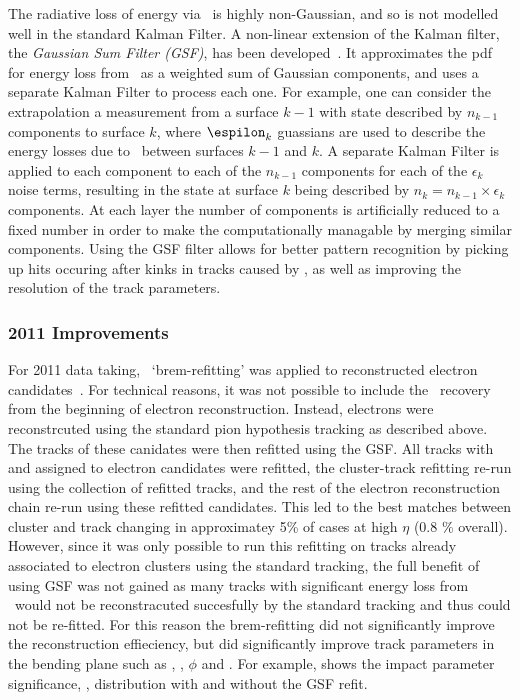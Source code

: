 The radiative loss of energy via \brem\ is highly non-Gaussian, and so is not
modelled well in the standard Kalman Filter. A non-linear extension of the
Kalman filter, the {\it Gaussian Sum Filter (GSF)}, has been
developed~\cite{Fruhwirth2003131,Atkinson:1448253}. It
approximates the pdf for energy loss from \brem\ as a weighted sum of Gaussian
components, and uses a separate Kalman Filter to process each one. For example,
one can consider the extrapolation a measurement from a surface $k-1$ with state
described by $n_{k-1}$ components to surface $k$, where $\espilon_{k}$ guassians
are used to describe the energy losses due to \brem\ between surfaces $k-1$ and
$k$. A separate Kalman Filter is applied to each component to each of the $n_{k-1}$
components for each of the $\epsilon_{k}$ noise terms, resulting in the state at
surface $k$ being described by $n_{k} = n_{k-1} \times \epsilon_{k}$ components.
At each layer the number of components is artificially reduced to a fixed number
in order to make the computationally managable by merging similar components.
Using the GSF filter allows for better pattern recognition by picking up hits
occuring after kinks in tracks caused by \brem, as well as improving the
resolution of the track parameters.

\subsubsection{2011 Improvements}

For 2011 data taking, \brem\ `brem-refitting' was applied to
reconstructed electron candidates~\cite{ATLAS-CONF-2012-047}. For technical reasons, it was not possible to
include the \brem\ recovery from the beginning of electron reconstruction.
Instead, electrons were reconstrcuted using the standard pion hypothesis
tracking as described above. The tracks of these canidates were then refitted
using the GSF. All tracks with  and  assigned to
electron candidates were refitted, the cluster-track refitting re-run
using the collection of refitted tracks, and the rest of the electron reconstruction
chain re-run using these refitted candidates. This led to the best matches between
cluster and track changing in approximatey 5\% of cases at high $\eta$ (0.8 \%
overall). However, since it was only possible to run this refitting on tracks
already associated to electron clusters using the standard tracking, the full
benefit of using GSF was not gained as many tracks with significant energy loss
from \brem\ would not be reconstracuted succesfully by the standard tracking and
thus could not be re-fitted. For this reason the brem-refitting did not
significantly improve the reconstruction effieciency, but did significantly
improve track parameters in the bending plane such as \dzero, \dzerosig,
$\phi$ and \qoverp. For example,  shows the impact parameter
significance, \dzerosig, distribution with and without the GSF refit. 

